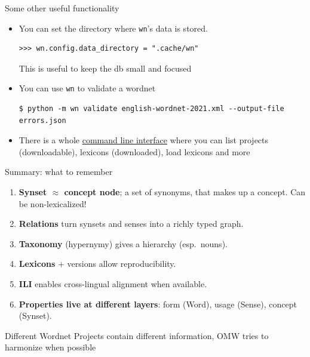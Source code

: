 \documentclass[aspectratio=169]{beamer}
\begin{document}
\begin{frame}[fragile]{Some other useful functionality}

  \begin{itemize}
  \item You can set the directory where \texttt{wn}'s data is stored.
\begin{verbatim}
>>> wn.config.data_directory = ".cache/wn"
\end{verbatim}
    This is useful to keep the db small and focused
  \item You can use \texttt{wn} to validate a wordnet
\begin{verbatim}
$ python -m wn validate english-wordnet-2021.xml --output-file errors.json
\end{verbatim} %
  \item There is a whole \href{https://wn.readthedocs.io/en/latest/cli.html}{command line interface}
where you can list projects (downloadable), lexicons (downloaded), load lexicons
 and more
  \end{itemize}
  
\end{frame}


\begin{frame}{Summary: what to remember}
\begin{enumerate}
  \item \textbf{Synset $\approx$ concept node}; a set of synonyms, that makes up a concept. Can be non-lexicalized!
  \item \textbf{Relations} turn synsets and senses into a richly typed graph.
  \item \textbf{Taxonomy} (hypernymy) gives a hierarchy (esp.\ nouns).
  \item \textbf{Lexicons} + versions allow reproducibility.
  \item \textbf{ILI} enables cross-lingual alignment when available.
  \item \textbf{Properties live at different layers}: form (Word), usage (Sense), concept (Synset).
  \end{enumerate}
  
Different Wordnet Projects contain different information, OMW tries to harmonize when possible

\end{frame}
\end{document}

